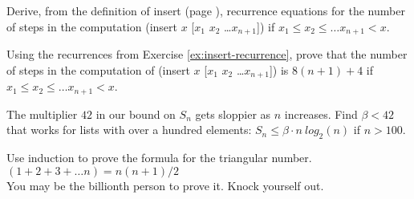 \begin{ExerciseList}

\Exercise
\label{ex:insert-recurrence}
Derive, from the definition of
\textsf{insert} (page \pageref{defun:insert-isort}),
recurrence equations for the number of steps
in the computation \textsf{(insert $x$ [$x_1$ $x_2$ \dots $x_{n+1}$])}
if $x_1 \leq x_2 \leq \dots x_{n+1} < x$.

\Exercise
\label{ex:insert-steps}
Using the recurrences from Exercise \ref{ex:insert-recurrence},
prove that the number of steps in the computation of
\textsf{(insert $x$ [$x_1$ $x_2$ \dots $x_{n+1}$])}
is $8(n+1)+4$ if $x_1 \leq x_2 \leq \dots x_{n+1} < x$.

\Exercise
The multiplier $42$ in our bound on $S_n$ gets sloppier as $n$ increases.
Find  $\beta < 42$ that works for lists with
over a hundred elements:
$S_{n} \leq \beta\cdot n~log_2(n)$ if $n > 100$.

\Exercise
\label{ex:triangular-number}
Use induction to prove the formula for the triangular number.\\
\hspace*{4cm}$(1 + 2 + 3 + \dots n) = n(n+1)/2$\\
\hspace*{17mm}You may be the billionth person to prove it. Knock yourself out.
\end{ExerciseList} 